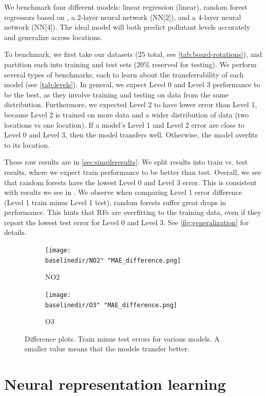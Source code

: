 \documentclass[journal abbreviation, manuscript]{copernicus}
\begin{document}
We benchmark four different models: linear regression (linear), random forest regressors based on \citep{Zimmerman2018},
a 2-layer neural network (NN[2]), and a 4-layer neural network (NN[4]). The ideal model will
both predict pollutant levels accurately and
generalize across locations.

To benchmark, we first take our datasets (25 total, see \autoref{tab:board-rotations}), and partition each into training and test sets (20\% reserved for testing).
We perform several types of benchmarks,
each to learn about the transferrability of each model (see \autoref{tab:levels}).
In general, we expect Level 0 and Level 3 performance to be the best, as they involve training and testing on data from the same distribution. Furthermore, we expected Level 2 to have lower error than Level 1, because Level 2 is trained on more data and a wider distribution of data (two locations vs one location).
If a model's Level 1 and Level 2 error are close to Level 0 and Level 3, then the model transfers well. Otherwise, the model overfits to its location.


These raw results are in \autoref{sec:simpleresults}. 
We split results into train vs. test
results, where we expect train performance
to be better than test.
Overall, we see that random forests have the lowest Level 0 and Level 3 error. This is consistent with results we see in \citet{Zimmerman2018}. 
We observe when comparing Level 1 error difference (Level 1 train minus Level 1 test), random forests suffer great
drops in performance.
This hints that RFs are overfitting to the training data, even if they
report the lowest test error for Level 0 and Level 3.  See \autoref{fig:generalization} for 
details.

\begin{figure}[H]
\centering
\begin{subfigure}{0.45\textwidth}
\texttt{[image: \\baselinedir/NO2" "MAE\_difference.png]}
\caption{NO2}
\end{subfigure}
\begin{subfigure}{0.45\textwidth}
\texttt{[image: \\baselinedir/O3" "MAE\_difference.png]}
\caption{O3}
\end{subfigure}
\caption{Difference plots. Train minus test errors for various models. A smaller value means that the models transfer better.}
\label{fig:generalization}
\end{figure}

\section{Neural representation learning}
\end{document}
